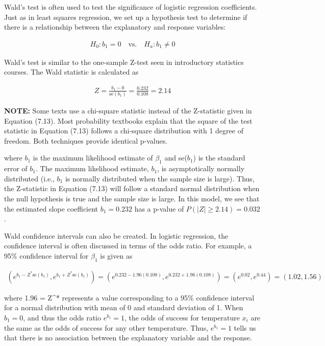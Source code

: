 \documentclass[
]{report}
\begin{document}
Wald's test is often used to test the significance of logistic regression coefficients. Just as in least squares regression, we set up a hypothesis test to determine if there is a relationship between the explanatory and response variables:

\begin{align}
H_0: b_1 = 0 \quad \text{vs.}\quad H_a: b_1 \neq 0
\end{align}

Wald's test is similar to the one-sample Z-test seen in introductory statistics courses. The Wald statistic is calculated as

\begin{align}
Z = \frac{b_1 - 0}{\text{se}(b_1)} = \frac{0.232}{0.108} = 2.14 \tag{7.13}
\end{align}

\large

\textbf{NOTE:}
Some texts use a chi-square statistic instead of the Z-statistic given in Equation (7.13). Most probability textbooks explain that the square of the test statistic in Equation (7.13) follows a chi-square distribution with 1 degree of freedom. Both techniques provide identical p-values.
\normalsize

where \(b_1\) is the maximum likelihood estimate of \(\beta_1\) and se(\(b_1\)) is the standard error of \(b_1\). The maximum likelihood estimate, \(b_1\), is asymptotically normally distributed (i.e., \(b_1\) is normally distributed when the sample size is large). Thus, the Z-statistic in Equation (7.13) will follow a standard normal distribution when the null hypothesis is true and the sample size is large. In this model, we see that the estimated slope coefficient \(b_1 = 0.232\) has a p-value of \(P(|Z| \geq 2.14) = 0.032\).

Wald confidence intervals can also be created. In logistic regression, the confidence interval is often discussed in terms of the odds ratio. For example, a 95\% confidence interval for \(\beta_1\) is given as

\begin{align}
(e^{b_1 - Z^* \text{se}(b_1)}, e^{b_1 + Z^* \text{se}(b_1)}) = (e^{0.232 - 1.96(0.108)}, e^{0.232 + 1.96(0.108)}) = (e^{0.02}, e^{0.44}) = (1.02, 1.56) \tag{7.14}
\end{align}

where 1.96 = Z\^{}* represents a value corresponding to a 95\% confidence interval for a normal distribution with mean of 0 and standard deviation of 1. When \(b_1 = 0\), and thus the odds ratio \(e^{b_1} = 1\), the odds of success for temperature \(x_i\) are the same as the odds of success for any other temperature. Thus, \(e^{b_1} = 1\) tells us that there is no association between the explanatory variable and the response.
\end{document}

